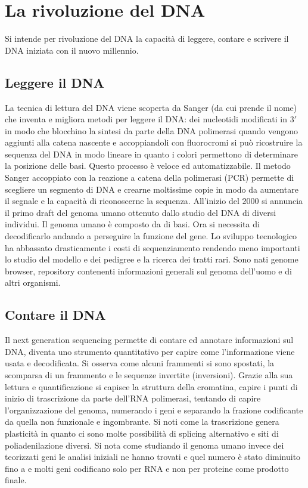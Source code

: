 \section{La rivoluzione del DNA}
Si intende per rivoluzione del DNA la capacit\`a di leggere, contare e scrivere il DNA iniziata con il nuovo millennio. 
\subsection{Leggere il DNA}
La tecnica di lettura del DNA viene scoperta da Sanger (da cui prende il nome) che inventa e migliora metodi per leggere il DNA: dei nucleotidi modificati in $3'$ in modo che blocchino
la sintesi da parte della DNA polimerasi quando vengono aggiunti alla catena nascente e accoppiandoli con fluorocromi si pu\`o ricostruire la sequenza del DNA in modo lineare in quanto
i colori permettono di determinare la posizione delle basi. Questo processo \`e veloce ed automatizzabile. Il metodo Sanger accoppiato con la reazione a catena della polimerasi (PCR)
permette di scegliere un segmento di DNA e crearne moltissime copie  in modo da aumentare il segnale e la capacit\`a di riconoscerne la sequenza. All'inizio del $2000$ si annuncia il 
primo draft del genoma umano ottenuto dallo studio del DNA di diversi individui. Il genoma umano \`e composto da  di basi. Ora si necessita di decodificarlo 
andando a perseguire la funzione del gene. Lo sviluppo tecnologico ha abbassato drasticamente i costi di sequenziamento rendendo meno importanti lo studio del modello e dei pedigree e 
la ricerca dei tratti rari. Sono nati genome browser, repository contenenti informazioni generali sul genoma dell'uomo e di altri organismi. 
\subsection{Contare il DNA}
Il next generation sequencing permette di contare ed annotare informazioni sul DNA, diventa uno strumento quantitativo per capire come l'informazione viene usata e decodificata. Si 
osserva come alcuni frammenti si sono spostati, la scomparsa di un frammento e le sequenze invertite (inversioni). Grazie alla sua lettura e quantificazione si capisce la struttura della
cromatina, capire i punti di inizio di trascrizione da parte dell'RNA polimerasi, tentando di capire l'organizzazione del genoma, numerando i geni e separando la frazione codificante
da quella non funzionale e ingombrante. Si noti come la trascrizione genera plasticit\`a in quanto ci sono molte possibilit\`a di splicing alternativo e siti di poliadenilazione 
diversi. Si nota come studiando il genoma umano invece dei teorizzati  geni le analisi iniziali ne hanno trovati  e quel numero \`e stato diminuito fino 
a  e molti geni codificano solo per RNA e non per proteine come prodotto finale. 
